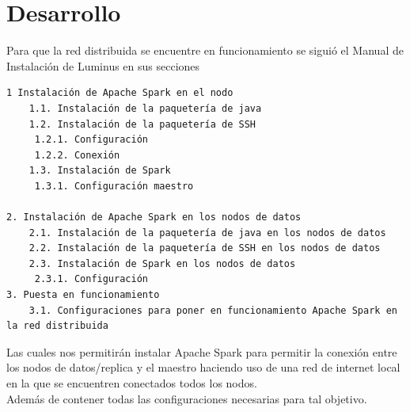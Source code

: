 \section{Desarrollo}
Para que la red distribuida se encuentre en funcionamiento se siguió el Manual de Instalación de Luminus 
en sus secciones 
\begin{verbatim}
1 Instalación de Apache Spark en el nodo
	1.1. Instalación de la paquetería de java 
	1.2. Instalación de la paquetería de SSH	
	 1.2.1. Configuración
	 1.2.2. Conexión
	1.3. Instalación de Spark
     1.3.1. Configuración maestro

2. Instalación de Apache Spark en los nodos de datos
	2.1. Instalación de la paquetería de java en los nodos de datos
	2.2. Instalación de la paquetería de SSH en los nodos de datos
	2.3. Instalación de Spark en los nodos de datos
     2.3.1. Configuración 
3. Puesta en funcionamiento
	3.1. Configuraciones para poner en funcionamiento Apache Spark en la red distribuida
\end{verbatim}
Las cuales nos permitirán instalar Apache Spark para permitir la conexión entre los nodos de datos/replica y el maestro haciendo uso de una red de internet local en la que se encuentren conectados todos los nodos.
\\
Además de contener todas las configuraciones necesarias para tal objetivo.  
